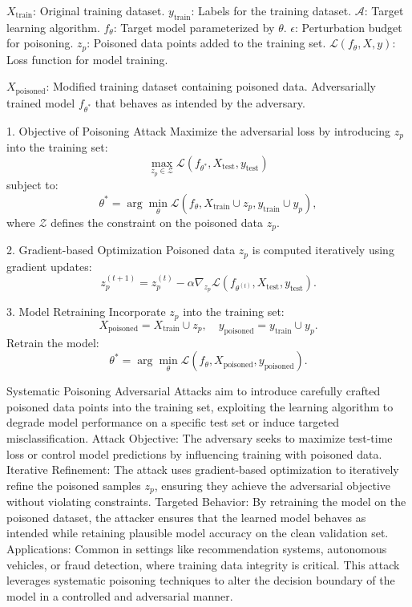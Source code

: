$X_{\text{train}}$: Original training dataset.
$y_{\text{train}}$: Labels for the training dataset.
$\mathcal{A}$: Target learning algorithm.
$f_{\theta}$: Target model parameterized by $\theta$.
$\epsilon$: Perturbation budget for poisoning.
$z_p$: Poisoned data points added to the training set.
$\mathcal{L}(f_{\theta}, X, y)$: Loss function for model training.

$X_{\text{poisoned}}$: Modified training dataset containing poisoned data.
Adversarially trained model $f_{\theta^{\ast}}$ that behaves as intended by the adversary.

1. Objective of Poisoning Attack
Maximize the adversarial loss by introducing $z_p$ into the training set:
\[
\max_{z_p \in \mathcal{Z}} \mathcal{L}(f_{\theta^{\ast}}, X_{\text{test}}, y_{\text{test}})
\]
subject to:
\[
\theta^{\ast} = \arg \min_{\theta} \mathcal{L}(f_{\theta}, X_{\text{train}} \cup z_p, y_{\text{train}} \cup y_p),
\]
where $\mathcal{Z}$ defines the constraint on the poisoned data $z_p$.

2. Gradient-based Optimization
Poisoned data $z_p$ is computed iteratively using gradient updates:
\[
z_p^{(t+1)} = z_p^{(t)} - \alpha \nabla_{z_p} \mathcal{L}(f_{\theta^{(t)}}, X_{\text{test}}, y_{\text{test}}).
\]

3. Model Retraining
Incorporate $z_p$ into the training set:
\[
X_{\text{poisoned}} = X_{\text{train}} \cup z_p, \quad y_{\text{poisoned}} = y_{\text{train}} \cup y_p.
\]
Retrain the model:
\[
\theta^{\ast} = \arg \min_{\theta} \mathcal{L}(f_{\theta}, X_{\text{poisoned}}, y_{\text{poisoned}}).
\]


Systematic Poisoning Adversarial Attacks aim to introduce carefully crafted poisoned data points into the training set, exploiting the learning algorithm to degrade model performance on a specific test set or induce targeted misclassification.
Attack Objective: The adversary seeks to maximize test-time loss or control model predictions by influencing training with poisoned data.
Iterative Refinement: The attack uses gradient-based optimization to iteratively refine the poisoned samples $z_p$, ensuring they achieve the adversarial objective without violating constraints.
Targeted Behavior: By retraining the model on the poisoned dataset, the attacker ensures that the learned model behaves as intended while retaining plausible model accuracy on the clean validation set.
Applications: Common in settings like recommendation systems, autonomous vehicles, or fraud detection, where training data integrity is critical. This attack leverages systematic poisoning techniques to alter the decision boundary of the model in a controlled and adversarial manner.